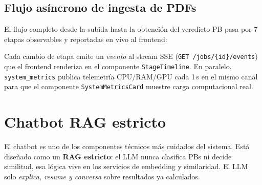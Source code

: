 \documentclass[11pt,a4paper]{article}
\newcommand{\modulo}[1]{\texttt{\textcolor{accent}{#1}}}
\begin{document}
\subsection{Flujo asíncrono de ingesta de PDFs}

El flujo completo desde la subida hasta la obtención del veredicto PB pasa por 7 etapas observables y reportadas en vivo al frontend:

\begin{center}
\end{center}

Cada cambio de etapa emite un \emph{evento} al stream SSE (\texttt{GET /jobs/\{id\}/events}) que el frontend renderiza en el componente \modulo{StageTimeline}. En paralelo, \modulo{system\_metrics} publica telemetría CPU/RAM/GPU cada 1\,s en el mismo canal para que el componente \modulo{SystemMetricsCard} muestre carga computacional real.

\section{Chatbot RAG estricto}\label{sec:chat}

El chatbot es uno de los componentes técnicos más cuidados del sistema. Está diseñado como un \textbf{RAG estricto}: el LLM nunca clasifica PBs ni decide similitud, esa lógica vive en los servicios de embedding y similaridad. El LLM solo \emph{explica, resume y conversa} sobre resultados ya calculados.
\end{document}
